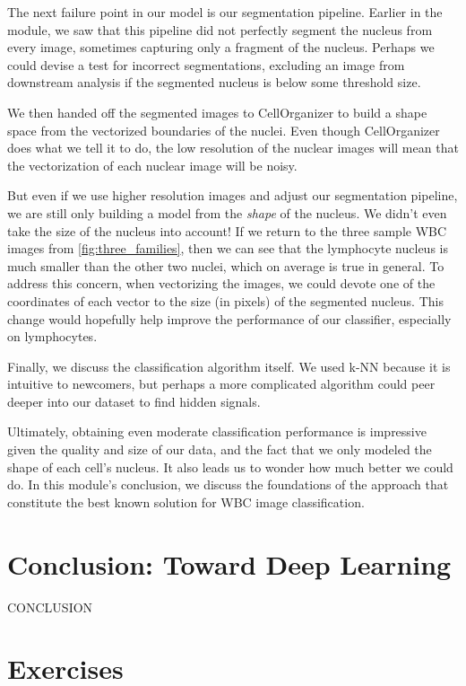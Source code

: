 The next failure point in our model is our segmentation pipeline. Earlier in the module, we saw that this pipeline did not perfectly segment the nucleus from every image, sometimes capturing only a fragment of the nucleus. Perhaps we could devise a test for incorrect segmentations, excluding an image from downstream analysis if the segmented nucleus is below some threshold size.

We then handed off the segmented images to CellOrganizer to build a shape space from the vectorized boundaries of the nuclei. Even though CellOrganizer does what we tell it to do, the low resolution of the nuclear images will mean that the vectorization of each nuclear image will be noisy.

But even if we use higher resolution images and adjust our segmentation pipeline, we are still only building a model from the \textit{shape} of the nucleus. We didn't even take the size of the nucleus into account! If we return to the three sample WBC images from \autoref{fig:three_families}, then we can see that the lymphocyte nucleus is much smaller than the other two nuclei, which on average is true in general. To address this concern, when vectorizing the images, we could devote one of the coordinates of each vector to the size (in pixels) of the segmented nucleus. This change would hopefully help improve the performance of our classifier, especially on lymphocytes.\\

\begin{qbox}\end{qbox}

Finally, we discuss the classification algorithm itself. We used k-NN because it is intuitive to newcomers, but perhaps a more complicated algorithm could peer deeper into our dataset to find hidden signals.

Ultimately, obtaining even moderate classification performance is impressive given the quality and size of our data, and the fact that we only modeled the shape of each cell's nucleus. It also leads us to wonder how much better we could do. In this module's conclusion, we discuss the foundations of the approach that constitute the best known solution for WBC image classification.\\

\FloatBarrier
{}
\section{Conclusion: Toward Deep Learning}
\label{sec:conclusion}

CONCLUSION

\FloatBarrier

\newpage
\section{Exercises}
\label{sec:exercises}

\begin{exercise}\end{exercise}
